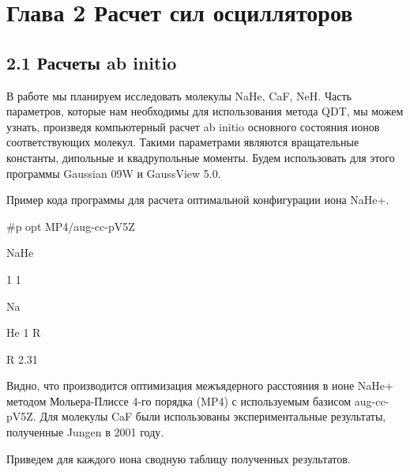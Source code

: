 \documentclass{article}
\begin{document}
\vspace{24pt}
\section*{{\large{}{\color{color17} \textbf{Глава 2 Расчет сил осцилляторов\label{HToc453749993}}}}}

\vspace{10pt}
\subsection*{{\large{}{\color{color18} \textbf{2.1 Расчеты ab initio}}}}

\vspace{10pt}
\baselineskip=13pt
{\large{}В работе мы планируем исследовать молекулы 
NaHe, CaF, NeH. Часть параметров, которые нам необходимы 
для использования метода QDT, мы можем узнать, 
произведя компьютерный расчет ab initio основного 
состояния ионов соответствующих молекул. Такими 
параметрами являются вращательные константы, 
дипольные и квадрупольные моменты. Будем использовать 
для этого программы Gaussian 09W и GaussView 5.0.}

\vspace{10pt}
{\large{}Пример кода программы для расчета оптимальной 
конфигурации иона NaHe+.}

\vspace{10pt}
\leftskip=49pt
{\large{}\#p opt MP4/aug-cc-pV5Z}

\vspace{10pt}
{\large{}NaHe}

\vspace{10pt}
{\large{}1 1}

\vspace{10pt}
{\large{}Na             }

\vspace{10pt}
{\large{}He 1 R}

\vspace{10pt}
{\large{}R 2.31}

\vspace{10pt}
\leftskip=0pt
{\large{}Видно, что производится оптимизация межъядерного 
расстояния в ионе NaHe+ методом Мольера-Плиссе 
4-го порядка (MP4) с используемым базисом aug-cc-pV5Z. 
Для молекулы CaF были использованы экспериментальные 
результаты, полученные Jungen в 2001 году.}

\vspace{10pt}
{\large{}Приведем для каждого иона сводную таблицу 
полученных результатов.}
\end{document}
